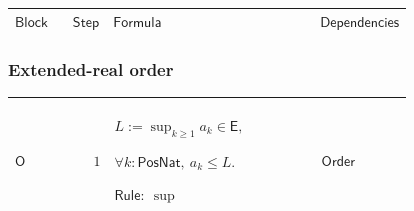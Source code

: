 \documentclass[12pt,reqno]{amsart}
\theoremstyle{blueplain}
\numberwithin{equation}{section}
\newlength{\DCTOneColumnBody}
\begin{document}
{\scriptsize {\ }}

{\scriptsize \setlength{\parskip}{0pt}\nointerlineskip
\noindent 
\begin{tabular}{|@{}>{\centering\arraybackslash}m{\DCTOneColumnBody}|}
\hline
$\displaystyle \mathsf{Proofs}$ \\ \hline
\end{tabular}%
}

{\scriptsize \setlength{\parskip}{0pt}\nointerlineskip
\noindent 
\begin{tabular}{|@{}>{\centering\arraybackslash}m{0.10658\linewidth}|>{\centering\arraybackslash}m{0.03553\linewidth}|>{\centering\arraybackslash}m{0.52105\linewidth}|>{\centering\arraybackslash}m{0.23684\linewidth}|}
\hline
$\displaystyle \mathsf{Block}$ & $\displaystyle \mathsf{Step}$ & $%
\displaystyle \mathsf{Formula}$ & $\displaystyle \mathsf{Dependencies}$ \\ 
\hline
\end{tabular}%
}

\subsubsection{\protect\scriptsize Extended-real order}

{\scriptsize \setlength{\parskip}{0pt}\nointerlineskip
\noindent 
\begin{tabular}{|@{}>{\centering\arraybackslash}m{\DCTOneColumnBody}|}
\hline
$\displaystyle \mathsf{Context\_O}:=$\par$\displaystyle a:\mathsf{PosNat}\to%
\mathsf{E},\quad\mathsf{Mono}(a).$ \\ \hline
\end{tabular}%
}

{\scriptsize \setlength{\parskip}{0pt}\nointerlineskip
\noindent 
\begin{tabular}{|@{}>{\centering\arraybackslash}m{0.10658\linewidth}|>{\centering\arraybackslash}m{0.03553\linewidth}|>{\centering\arraybackslash}m{0.52105\linewidth}|>{\centering\arraybackslash}m{0.23684\linewidth}|}
\hline
\hypertarget{proof:O1}{$\displaystyle \mathsf{O}$} & $\displaystyle 1$ & $%
\displaystyle L:=\sup_{k\ge1}a_k\in\mathsf{E},$\par$\displaystyle \forall k:%
\mathsf{PosNat},\ a_k\le L.$\par$\displaystyle \mathsf{Rule}:\ \sup$ & 
\hyperlink{ax:Order}{$\displaystyle \mathsf{Order}$} \\ \hline
\end{tabular}%
}
\end{document}
